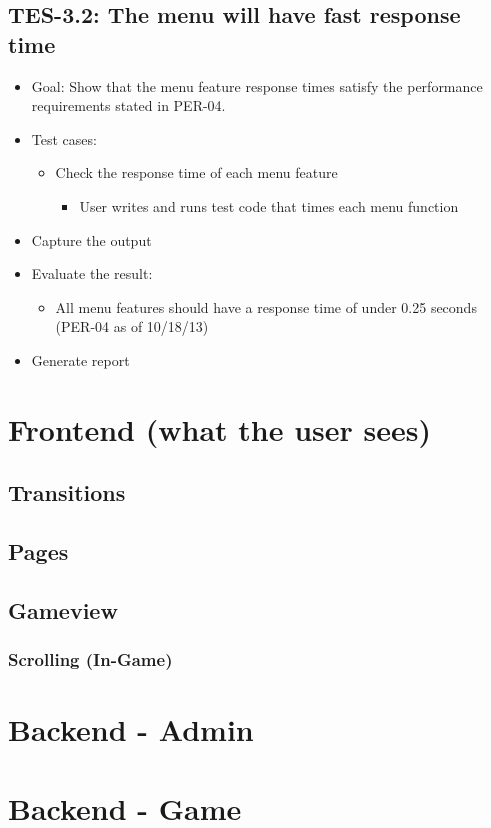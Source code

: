 \subsection{TES-3.2: The menu will have fast response time }
\begin{itemize}
\item Goal: Show that the menu feature response times satisfy the performance
requirements stated in PER-04. 
\item Test cases: 

\begin{itemize}
\item Check the response time of each menu feature 

\begin{itemize}
\item User writes and runs test code that times each menu function 
\end{itemize}
\end{itemize}
\item Capture the output 
\item Evaluate the result: 

\begin{itemize}
\item All menu features should have a response time of under 0.25 seconds
(PER-04 as of 10/18/13) 
\end{itemize}
\item Generate report \end{itemize}
\section{Frontend (what the user sees)}
\subsection{Transitions}
\subsection{Pages}
\subsection{Gameview}
\subsubsection{Scrolling (In-Game)}
\section{Backend - Admin}
\section{Backend - Game}
